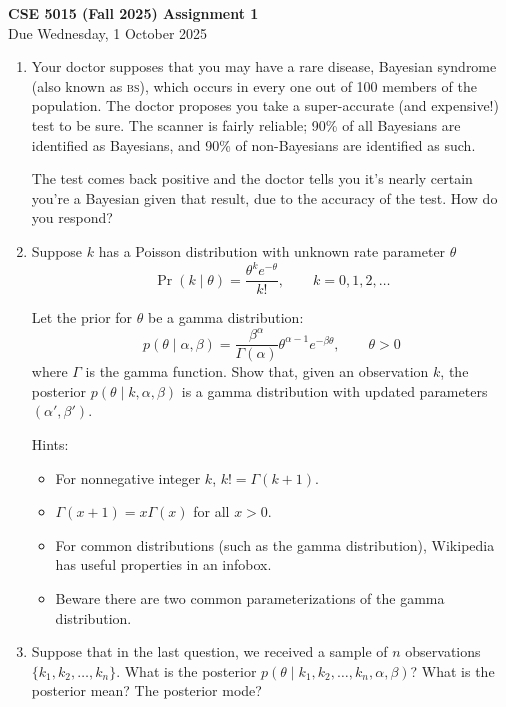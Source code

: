 \documentclass{article}
\newcommand{\acro}[1]{\textsc{\MakeLowercase{#1}}}
\newcommand{\given}{\mid}
\begin{document}
{\large \textbf{CSE 5015 (Fall 2025) Assignment 1}} \\
Due Wednesday, 1 October 2025 \\

\begin{enumerate}

\item
  Your doctor supposes that you may have a rare disease, Bayesian
  syndrome (also known as \acro{BS}), which occurs in every one out of
  100 members of the population. The doctor proposes you take a
  super-accurate (and expensive!) test to be sure.  The scanner is
  fairly reliable; 90\% of all Bayesians are identified as Bayesians,
  and 90\% of non-Bayesians are identified as such.

  The test comes back positive and the doctor tells you it's nearly
  certain you're a Bayesian given that result, due to the accuracy of
  the test. How do you respond?

\item
  Suppose $k$ has a Poisson distribution with unknown rate parameter
  $\theta$
  \[
    \Pr(k \given \theta) = \frac{\theta^k e^{-\theta}}{k!},
    \qquad
    k = 0, 1, 2, \dotsc
  \]

  Let the prior for $\theta$ be a gamma distribution:
  \[
    p(\theta \given \alpha, \beta)
    =
    \frac{\beta^\alpha}
         {\Gamma(\alpha)}
    \theta^{\alpha - 1}e^{-\beta\theta},
    \qquad \theta > 0
  \]
  where $\Gamma$ is the gamma function.  Show that, given an
  observation $k$, the posterior $p(\theta \given k, \alpha, \beta)$
  is a gamma distribution with updated parameters $(\alpha', \beta')$.

  Hints:
  \begin{itemize}
  \item For nonnegative integer $k$, $k! = \Gamma(k + 1)$.
  \item $\Gamma(x + 1) = x\Gamma(x)$ for all $x > 0$.
  \item For common distributions (such as the gamma distribution),
    Wikipedia has useful properties in an infobox.
  \item Beware there are two common parameterizations of the gamma distribution.
  \end{itemize}

\item
  Suppose that in the last question, we received a sample of $n$
  observations $\{k_1, k_2, \dotsc, k_n\}$. What is the posterior
  $p(\theta \given k_1, k_2, \dotsc, k_n, \alpha, \beta)$? What is the
  posterior mean? The posterior mode?


\end{enumerate}
\end{document}
